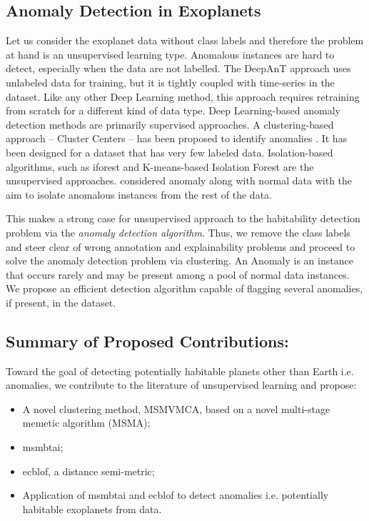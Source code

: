 \documentclass[fleqn,usenatbib]{mnras}
\begin{document}
\subsection{Anomaly Detection in Exoplanets} Let us consider the exoplanet data without class labels and therefore the problem at hand is an unsupervised learning type. Anomalous instances are hard to detect, especially when the data are not labelled. The DeepAnT \citep{Munir} approach uses unlabeled data for training, but it is tightly coupled with time-series in the dataset. Like any other Deep Learning method, this approach requires retraining from scratch for a different kind of data type. Deep Learning-based anomaly detection methods are primarily supervised approaches. A clustering-based approach -- Cluster Centers -- has been proposed to identify anomalies \citep{Castellani}. It has been designed for a dataset that has very few labeled data. Isolation-based algorithms, such as \acrshort{iforest} and K-means-based Isolation Forest are the unsupervised approaches. \citet{Karczmarek} considered anomaly along with normal data with the aim to isolate anomalous instances from the rest of the data.

This makes a strong case for unsupervised approach to the habitability detection problem via the \textit{anomaly detection algorithm}. Thus, we remove the class labels and steer clear of wrong annotation and explainability problems and proceed to solve the anomaly detection problem via clustering. An Anomaly is an instance that occurs rarely and may be present among a pool of normal data instances. We propose an efficient detection algorithm capable of flagging several anomalies, if present, in the dataset. 

\subsection{Summary of Proposed Contributions:}

Toward the goal of detecting potentially habitable planets other than Earth i.e. anomalies, we contribute to the literature of unsupervised learning and propose:
\begin{itemize}
\item A novel clustering method, MSMVMCA, based on a novel multi-stage memetic algorithm (MSMA);
\item \glsdisablehyper \acrfull{msmbtai};
\item \acrfull{ecblof}, a distance semi-metric;
\item Application of \acrfull{msmbtai} and \acrfull{ecblof} to detect anomalies i.e. potentially habitable exoplanets from data.
\end{itemize}
\end{document}
